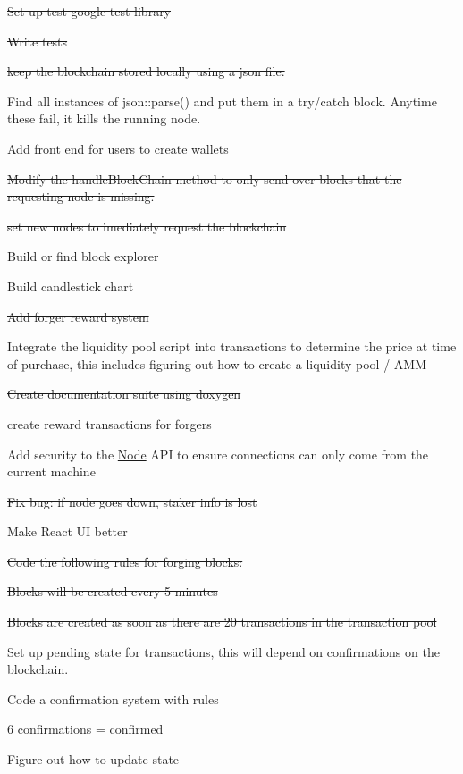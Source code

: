 
\begin{DoxyItemize}
\item \sout{Set up test google test library}
\item \sout{Write tests}
\item \sout{keep the blockchain stored locally using a json file.}
\item Find all instances of json\+::parse() and put them in a try/catch block. Anytime these fail, it kills the running node.
\item Add front end for users to create wallets
\item \sout{Modify the handle\+Block\+Chain method to only send over blocks that the requesting node is missing.}
\item \sout{set new nodes to imediately request the blockchain}
\item Build or find block explorer
\item Build candlestick chart
\item \sout{Add forger reward system}
\item Integrate the liquidity pool script into transactions to determine the price at time of purchase, this includes figuring out how to create a liquidity pool / AMM
\item \sout{Create documentation suite using doxygen}
\item create reward transactions for forgers
\item Add security to the \mbox{\hyperlink{class_node}{Node}} API to ensure connections can only come from the current machine
\item \sout{Fix bug\+: if node goes down, staker info is lost}
\item Make React UI better
\item \sout{Code the following rules for forging blocks\+:}
\begin{DoxyItemize}
\item \sout{Blocks will be created every 5 minutes}
\item \sout{Blocks are created as soon as there are 20 transactions in the transaction pool}
\end{DoxyItemize}
\item Set up pending state for transactions, this will depend on confirmations on the blockchain.
\item Code a confirmation system with rules
\begin{DoxyItemize}
\item 6 confirmations = confirmed
\item Figure out how to update state

\end{DoxyItemize}
\end{DoxyItemize}
